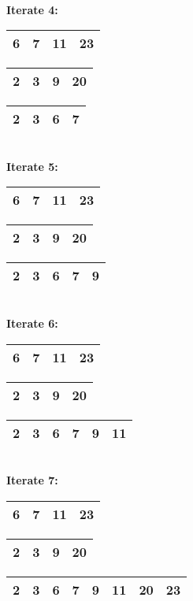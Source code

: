 \documentclass[a4paper,12pt]{article}
\begin{document}
\quad\\
\textbf{Iterate 4:}
\quad
\begin{tabular}{|c|c|c|c|}
  \hline 6 & \cellcolor{gray}7 & 11 & 23 \\ \hline
\end{tabular}
\quad 
\begin{tabular}{|c|c|c|c|}
  \hline  2 & 3 & \cellcolor{gray}9 & 20 \\ \hline
\end{tabular}
\quad 
\begin{tabular}{|c|c|c|c|}
  \hline 2 & 3 & 6 & 7\\ \hline
\end{tabular}

\quad\\
\textbf{Iterate 5:}
\quad
\begin{tabular}{|c|c|c|c|}
  \hline 6 &  7 & \cellcolor{gray}11 & 23 \\ \hline
\end{tabular}
\quad 
\begin{tabular}{|c|c|c|c|}
  \hline  2 & 3 & \cellcolor{gray}9 & 20 \\ \hline
\end{tabular}
\quad 
\begin{tabular}{|c|c|c|c|c|}
  \hline 2 & 3 & 6 & 7 & 9\\ \hline
\end{tabular}

\quad\\
\textbf{Iterate 6:}
\quad
\begin{tabular}{|c|c|c|c|}
  \hline 6 &  7 & \cellcolor{gray}11 & 23 \\ \hline
\end{tabular}
\quad 
\begin{tabular}{|c|c|c|c|}
  \hline  2 & 3 & 9 & \cellcolor{gray}20 \\ \hline
\end{tabular}
\quad 
\begin{tabular}{|c|c|c|c|c|c|}
  \hline 2 & 3 & 6 & 7 & 9 & 11\\ \hline
\end{tabular}

\quad\\
\textbf{Iterate 7:}
\quad
\begin{tabular}{|c|c|c|c|}
  \hline 6 &  7 & 11 & \cellcolor{gray}23 \\ \hline
\end{tabular}
\quad 
\begin{tabular}{|c|c|c|c|}
  \hline  2 & 3 & 9 & \cellcolor{gray}20 \\ \hline
\end{tabular}
\quad 
\begin{tabular}{|c|c|c|c|c|c|c|c|}
  \hline 2 & 3 & 6 & 7 & 9 & 11 & 20 & 23\\ \hline
\end{tabular}
\end{document}
